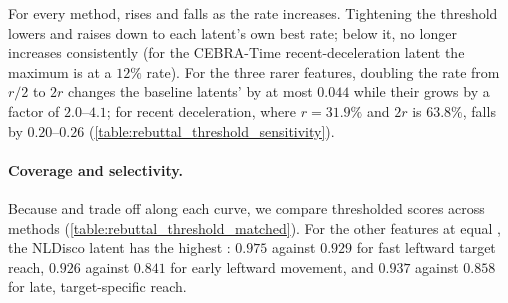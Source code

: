 For every method,  rises and  falls as the rate increases. Tightening the threshold lowers  and raises  down to each latent's own best rate; below it,  no longer increases consistently (for the CEBRA-Time recent-deceleration latent the maximum is at a $12\%$ rate). For the three rarer features, doubling the rate from $r/2$ to $2r$ changes the baseline latents'  by at most $0.044$ while their  grows by a factor of $2.0$--$4.1$; for recent deceleration, where $r=31.9\%$ and $2r$ is $63.8\%$,  falls by $0.20$--$0.26$ (\autoref{table:rebuttal_threshold_sensitivity}).

\paragraph{Coverage and selectivity.} Because  and  trade off along each curve, we compare thresholded scores across methods (\autoref{table:rebuttal_threshold_matched}). For the other features at equal , the NLDisco latent has the highest : $0.975$ against $0.929$ for fast leftward target reach, $0.926$ against $0.841$ for early leftward movement, and $0.937$ against $0.858$ for late, target-specific reach.

\begin{table}[!htbp]
    \centering
    {\small\setlength{\tabcolsep}{4pt}\renewcommand{\arraystretch}{1.08}
    }
    \caption{\textbf{Coverage and selectivity of selected latents.} Development windows. NLDisco: the reference latent of each feature at its native threshold $z>0$. Baselines: selected threshold scores for each latent.}
    \label{table:rebuttal_threshold_matched}
\end{table}


